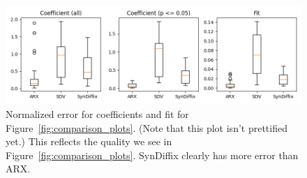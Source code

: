 
        \begin{figure}
        \begin{center}
        \includegraphics[width=0.65\linewidth]{norm_err_tab3_fig1}
        \caption{Normalized error for coefficients and fit for Figure~\ref{fig:comparison_plots}. (Note that this plot isn't prettified yet.) This reflects the quality we see in Figure~\ref{fig:comparison_plots}. SynDiffix clearly has more error than ARX.
        }
        \end{center}
        \end{figure}
    